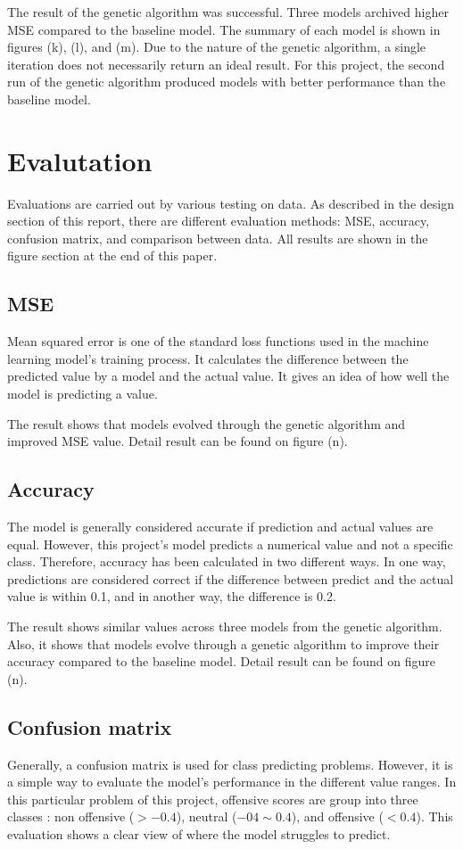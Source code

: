 \documentclass[11pt, natbib=false]{article}
\begin{document}
The result of the genetic algorithm was successful.
Three models archived higher MSE compared to the baseline model.
The summary of each model is shown in figures (k), (l), and (m).
Due to the nature of the genetic algorithm, a single iteration does not necessarily return an ideal result.
For this project, the second run of the genetic algorithm produced models with better performance than the baseline model.


\section{Evalutation}
Evaluations are carried out by various testing on data.
As described in the design section of this report, there are different evaluation methods: MSE, accuracy, confusion matrix, and comparison between data.
All results are shown in the figure section at the end of this paper.

\subsection{MSE}
Mean squared error is one of the standard loss functions used in the machine learning model's training process.
It calculates the difference between the predicted value by a model and the actual value.
It gives an idea of how well the model is predicting a value.

The result shows that models evolved through the genetic algorithm and improved MSE value.
Detail result can be found on figure (n).

\subsection{Accuracy}
The model is generally considered accurate if prediction and actual values are equal.
However, this project's model predicts a numerical value and not a specific class.
Therefore, accuracy has been calculated in two different ways.
In one way, predictions are considered correct if the difference between predict and the actual value is within 0.1, and in another way, the difference is 0.2.

The result shows similar values across three models from the genetic algorithm.
Also, it shows that models evolve through a genetic algorithm to improve their accuracy compared to the baseline model.
Detail result can be found on figure (n).

\subsection{Confusion matrix}
Generally, a confusion matrix is used for class predicting problems.
However, it is a simple way to evaluate the model’s performance in the different value ranges.
In this particular problem of this project, offensive scores are group into three classes : non offensive ($ > -0.4 $), neutral ($ -04 \sim 0.4 $), and offensive ($ < 0.4 $).
This evaluation shows a clear view of where the model struggles to predict.
\end{document}

